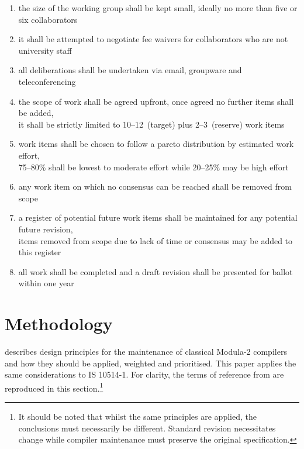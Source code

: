 \documentclass[10pt,a4paper,leqno,fleqn]{article}
\begin{document}
\renewcommand{\labelenumi}{(\arabic{enumi})}
\begin{enumerate}[leftmargin=!, labelindent=-0.75em, itemindent=0em]
\item the size of the working group shall be kept small,
ideally no more than five or six collaborators
\item it shall be attempted to negotiate fee waivers for collaborators who are not
university staff
\item all deliberations shall be undertaken via email, groupware and
teleconferencing
\item the scope of work shall be agreed upfront, once agreed no further items
shall be added, \\
it shall be strictly limited to 10--12~(target) plus 2--3~(reserve) work items
\item work items shall be chosen to follow a pareto distribution by estimated
work effort, \\
75--80\% shall be lowest to moderate effort while 20--25\% may be high effort
\item any work item on which no consensus can be reached shall be removed
from scope
\item a register of potential future work items shall be maintained for any
potential future revision, \\
items removed from scope due to lack of time or consensus may be added
to this register
\item all work shall be completed and a draft revision shall be presented for
ballot within one year
\end{enumerate}


\section{Methodology}

\cite{Kowarsch18} describes design principles for the maintenance of
classical Modula-2 compilers and how they should be applied, weighted
and prioritised. This paper applies the same considerations to IS 10514-1.
For clarity, the terms of reference from \cite{Kowarsch18} are reproduced
in this section.\footnote
{It should be noted that whilst the same principles are applied, the
conclusions must necessarily be different. Standard revision necessitates
change while compiler maintenance must preserve the original specification.}
\end{document}
